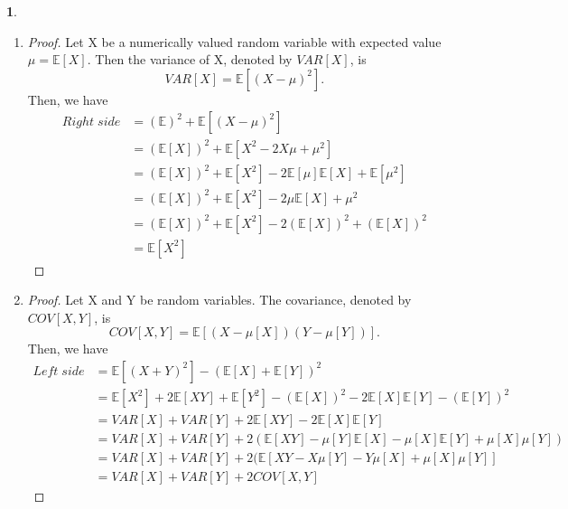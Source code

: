 \documentclass[10pt]{article}
\newtheorem{prob}{\bm{$Problem$}}
\begin{document}
\begin{prob}
\end{prob}
\begin{enumerate}[1)]
\vspace{3mm}

\item
\begin{proof}
Let X be a numerically valued random variable with expected value $\mu = \mathbb{E}[X]$. Then the variance of X, denoted by $VAR[X]$, is
\begin{equation}
VAR[X]=\mathbb{E}[(X-\mu)^2].
\end{equation}
Then, we have
\begin{align*}
Right\;side&=(\mathbb{E})^2+\mathbb{E}[(X-\mu)^2]\\
&=(\mathbb{E}[X])^2+\mathbb{E}[X^2-2X\mu+\mu^2]\\
&=(\mathbb{E}[X])^2+\mathbb{E}[X^2]-2\mathbb{E}[\mu]\mathbb{E}[X]+\mathbb{E}[\mu^2]\\
&=(\mathbb{E}[X])^2+\mathbb{E}[X^2]-2\mu\mathbb{E}[X]+\mu^2\\
&=(\mathbb{E}[X])^2+\mathbb{E}[X^2]-2(\mathbb{E}[X])^2+(\mathbb{E}[X])^2\\
&=\mathbb{E}[X^2]
\end{align*}
\end{proof}
\vspace{3mm}

\item
\begin{proof}
Let X and Y be random variables. The covariance, denoted by $COV[X,Y]$, is
\begin{equation}
COV[X,Y]=\mathbb{E}[(X-\mu[X])(Y-\mu[Y])].
\end{equation}
Then, we have
\begin{align*}
Left\;side&=\mathbb{E}[(X+Y)^2]-(\mathbb{E}[X]+\mathbb{E}[Y])^2\\
&=\mathbb{E}[X^2]+2\mathbb{E}[XY]+\mathbb{E}[Y^2]-(\mathbb{E}[X])^2-2\mathbb{E}[X]\mathbb{E}[Y]-(\mathbb{E}[Y])^2\\
&=VAR[X]+VAR[Y]+2\mathbb{E}[XY]-2\mathbb{E}[X]\mathbb{E}[Y]\\
&=VAR[X]+VAR[Y]+2(\mathbb{E}[XY]-\mu[Y]\mathbb{E}[X]-\mu[X]\mathbb{E}[Y]+\mu[X]\mu[Y])\\
&=VAR[X]+VAR[Y]+2(\mathbb{E}[XY-X\mu[Y]-Y\mu[X]+\mu[X]\mu[Y]]\\
&=VAR[X]+VAR[Y]+2COV[X,Y]
\end{align*}
\end{proof}
\vspace{3mm}


\end{enumerate}
\end{document}
